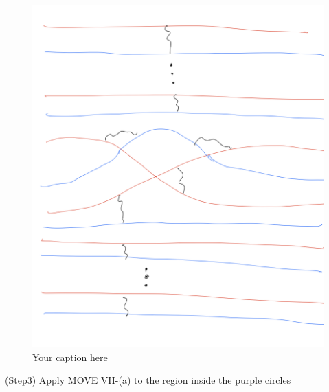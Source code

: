 \begin{figure}[H] %
    \centering
    \includegraphics[width=\linewidth]{diagrams/definition12/6.png} %
    \caption{Your caption here}
    \label{fig:your-label}
\end{figure}
(Step3) Apply MOVE \RN{7}-(a) to the region inside the purple circles

